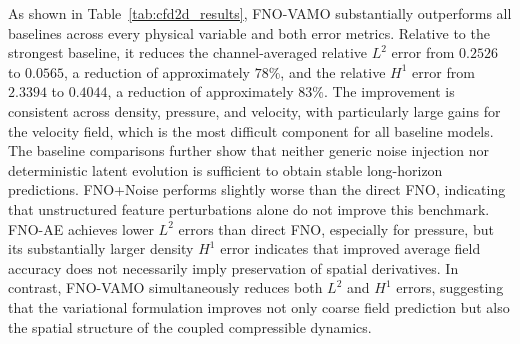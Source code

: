 \documentclass[11pt]{article}
\begin{document}
\begin{table}[t]
\centering
\caption{Results on 2D compressible fluid dynamics. We report rollout-aggregated relative $L^2$ and $H^1$ errors for density $\rho$, pressure $p$, velocity $\mathbf v=(v_x,v_y)$, and their channel average. Lower is better.}
\label{tab:cfd2d_results}
\end{table}
As shown in Table~\ref{tab:cfd2d_results}, FNO-VAMO substantially outperforms all baselines across every physical variable and both error metrics. Relative to the strongest baseline, it reduces the channel-averaged relative $L^2$ error from $0.2526$ to $0.0565$, a reduction of approximately $78\%$, and the relative $H^1$ error from $2.3394$ to $0.4044$, a reduction of approximately $83\%$. The improvement is consistent across density, pressure, and velocity, with particularly large gains for the velocity field, which is the most difficult component for all baseline models. The baseline comparisons further show that neither generic noise injection nor deterministic latent evolution is sufficient to obtain stable long-horizon predictions. FNO+Noise performs slightly worse than the direct FNO, indicating that unstructured feature perturbations alone do not improve this benchmark. FNO-AE achieves lower $L^2$ errors than direct FNO, especially for pressure, but its substantially larger density $H^1$ error indicates that improved average field accuracy does not necessarily imply preservation of spatial derivatives. In contrast, FNO-VAMO simultaneously reduces both $L^2$ and $H^1$ errors, suggesting that the variational formulation improves not only coarse field prediction but also the spatial structure of the coupled compressible dynamics.
\end{document}

